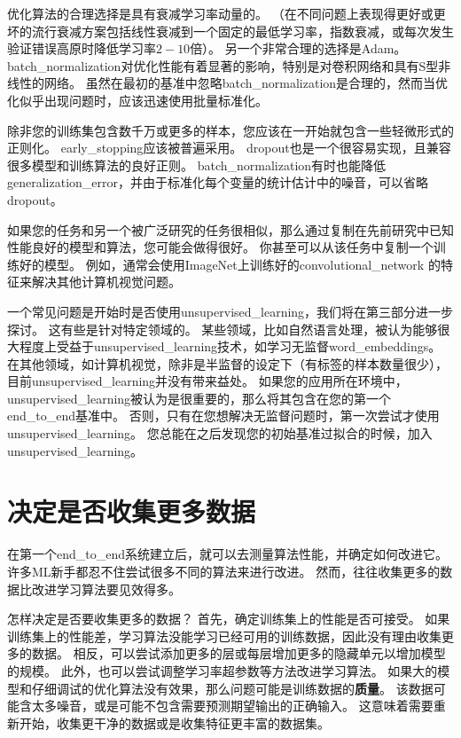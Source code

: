 优化算法的合理选择是具有衰减学习率动量的。
（在不同问题上表现得更好或更坏的流行衰减方案包括线性衰减到一个固定的最低学习率，指数衰减，或每次发生验证错误高原时降低学习率$2-10$倍）。
另一个非常合理的选择是Adam。
\gls{batch_normalization}对优化性能有着显著的影响，特别是对卷积网络和具有S型非线性的网络。
虽然在最初的基准中忽略\gls{batch_normalization}是合理的，然而当优化似乎出现问题时，应该迅速使用批量标准化。

除非您的训练集包含数千万或更多的样本，您应该在一开始就包含一些轻微形式的正则化。 
\gls{early_stopping}应该被普遍采用。
\gls{dropout}也是一个很容易实现，且兼容很多模型和训练算法的良好正则。
\gls{batch_normalization}有时也能降低\gls{generalization_error}，并由于标准化每个变量的统计估计中的噪音，可以省略\gls{dropout}。


如果您的任务和另一个被广泛研究的任务很相似，那么通过复制在先前研究中已知性能良好的模型和算法，您可能会做得很好。
你甚至可以从该任务中复制一个训练好的模型。
例如，通常会使用ImageNet上训练好的\gls{convolutional_network} 的特征来解决其他计算机视觉问题\citep{girshickregion}。

一个常见问题是开始时是否使用\gls{unsupervised_learning}，我们将在第三部分进一步探讨。
这有些是针对特定领域的。
某些领域，比如自然语言处理，被认为能够很大程度上受益于\gls{unsupervised_learning}技术，如学习无监督\gls{word_embeddings}。
在其他领域，如计算机视觉，除非是半监督的设定下（有标签的样本数量很少）\citep{Kingma-et-al-NIPS2014,Rasmus-et-al-arxiv2015}，目前\gls{unsupervised_learning}并没有带来益处。
如果您的应用所在环境中，\gls{unsupervised_learning}被认为是很重要的，那么将其包含在您的第一个\gls{end_to_end}基准中。
否则，只有在您想解决无监督问题时，第一次尝试才使用\gls{unsupervised_learning}。
您总能在之后发现您的初始基准过拟合的时候，加入\gls{unsupervised_learning}。

\section{决定是否收集更多数据}
\label{sec:determining_whether_to_gather_more_data}
在第一个\gls{end_to_end}系统建立后，就可以去测量算法性能，并确定如何改进它。
许多\gls{ML}新手都忍不住尝试很多不同的算法来进行改进。
然而，往往收集更多的数据比改进学习算法要见效得多。

怎样决定是否要收集更多的数据？
首先，确定训练集上的性能是否可接受。
如果训练集上的性能差，学习算法没能学习已经可用的训练数据，因此没有理由收集更多的数据。
相反，可以尝试添加更多的层或每层增加更多的隐藏单元以增加模型的规模。
此外，也可以尝试调整学习率超参数等方法改进学习算法。
如果大的模型和仔细调试的优化算法没有效果，那么问题可能是训练数据的\textbf{质量}。
该数据可能含太多噪音，或是可能不包含需要预测期望输出的正确输入。
这意味着需要重新开始，收集更干净的数据或是收集特征更丰富的数据集。

